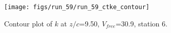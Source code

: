 \begin{figure}[H]
\centering
\texttt{[image: figs/run\_59/run\_59\_ctke\_contour]}
\caption{Contour plot of $k$ at $z/c$=9.50, $V_{free}$=30.9, station 6.}
\end{figure}


